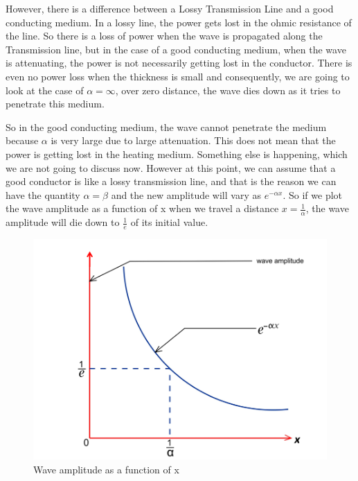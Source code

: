 However, there is a difference between a Lossy Transmission Line and a good conducting medium. In a lossy line, the power gets lost in the ohmic resistance of the line. So there is a loss of power when the wave is propagated along the Transmission line, but in the case of a good conducting medium, when the wave is attenuating, the power is not necessarily getting lost in the conductor. There is even no power loss when the thickness is small and consequently, we are going to look at the case of $\alpha=\infty$, over zero distance, the wave dies down as it tries to penetrate this medium.

So in the good conducting medium, the wave cannot penetrate the medium because $\alpha$ is very large due to large attenuation. This does not mean that the power is getting lost in the heating medium. Something else is happening, which we are not going to discuss now. However at this point, we can assume that a good conductor is like a lossy transmission line, and that is the reason we can have the quantity $\alpha=\beta$ and the new amplitude will vary as $e^{-\alpha x}$. So if we plot the wave amplitude as a function of x when we travel a distance $x=\frac{1}{\alpha}$, the wave amplitude will die down to $\frac{1}{e}$ of its initial value.
\begin{figure}[h]
\centering
\includegraphics[width=0.9\linewidth]{./graphics/wave_amplitude_as_function_of_x}
\caption{Wave amplitude as a function of x}
\label{fig:bello261}
\end{figure}

